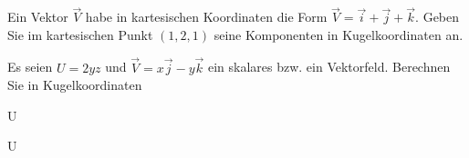 \begin{atiTask}[
  title = Differentialoperatoren in Kugelkoordinaten
]

\begin{atiSubtasks}
\item Ein Vektor $\vec{V}$ habe in kartesischen Koordinaten die Form
$\vec{V}=\vec{i}+\vec{j}+\vec{k}$. 
Geben Sie im kartesischen Punkt $(1,2,1)$ seine Komponenten in Kugelkoordinaten an.

\item Es seien $U=2yz$ und $\vec{V}=x\vec{j}-y\vec{k}$ ein skalares bzw. ein Vektorfeld. Berechnen Sie in Kugelkoordinaten 
\begin{multicols}{4}
\begin{atiSubequations}
	\item{U}
	\item{}
	\item{\gradient U}
	\item{\curl {}}

\end{atiSubequations}

\end{multicols}
\end{atiSubtasks} 


\end{atiTask}

\begin{atiSolution}
	
\end{atiSolution}